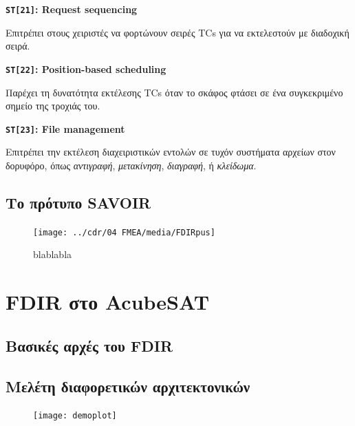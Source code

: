 \documentclass[a4paper,nobib]{tufte-book}
\begin{document}
\begin{compactitem}
		\item \textbf{\texttt{ST[21]}: Request sequencing}
		
		Επιτρέπει στους χειριστές να φορτώνουν σειρές \acp{TC} για να εκτελεστούν με διαδοχική σειρά.
		
		\item \textbf{\texttt{ST[22]}: Position-based scheduling}
		
		Παρέχει τη δυνατότητα εκτέλεσης \acp{TC} όταν το σκάφος φτάσει σε ένα συγκεκριμένο σημείο της τροχιάς του.
		
		\item \textbf{\texttt{ST[23]}: File management}
		
		Επιτρέπει την εκτέλεση διαχειριστικών εντολών σε τυχόν συστήματα αρχείων στον δορυφόρο, όπως \emph{αντιγραφή}, \emph{μετακίνηση}, \emph{διαγραφή}, ή \emph{κλείδωμα}.
\end{compactitem}

\section{Το πρότυπο SAVOIR}

\begin{figure}[h]
	\texttt{[image: ../cdr/04 FMEA/media/FDIRpus]}
	\caption{blablabla}
\end{figure}

\chapter{\ac{FDIR} στο AcubeSAT}

\section{Βασικές αρχές του \ac{FDIR}}


\section{Μελέτη διαφορετικών αρχιτεκτονικών}

\begin{figure}
	\centering
	\texttt{[image: demoplot]}
	\caption{}
\end{figure}
\end{document}
